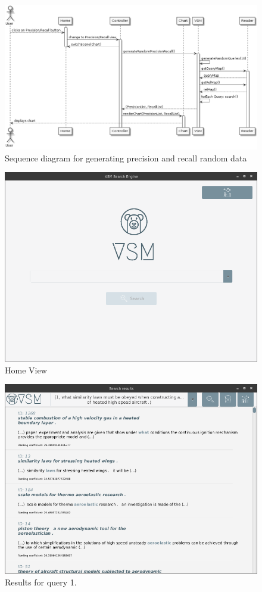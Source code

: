 \documentclass{article}
\begin{document}
\begin{figure}[h]
	\caption{Sequence diagram for generating precision and recall random data}
	\centering
	\includegraphics[scale=0.4]{precisionRecallDiagram}
\end{figure}

\begin{figure}[h]
	\caption{Home View}
	\centering
	\includegraphics[scale=0.5]{home}
\end{figure}

\begin{figure}[h]
	\caption{Results for query 1.}
	\centering
	\includegraphics[scale=0.5]{query1Results}
\end{figure}
\end{document}
